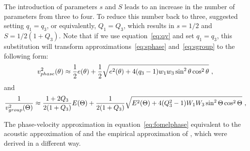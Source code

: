 The introduction of parameters $s$ and $S$ leads to an increase in the number of parameters from three to four.
To reduce this number back to three, \cite{fomel} suggested setting $q_1 = q_3$, 
or equivalently, $Q_1 = Q_3$, which results in $s = 1/2$ and $S = 1/2(1+Q_3)$. Note that if we use equation~\ref{eq:qv} and set $q_1 = q_3$, this substitution will transform approximations~\ref{eq:sphase} and~\ref{eq:sgroup} to the following form:
\begin{equation}
v^2_{phase}(\theta) \approx \frac{1}{2}e(\theta) + \frac{1}{2}\sqrt{e^2(\theta)+4(q_3-1)w_1w_3\sin^2\theta \cos^2\theta}~, \\
\label{eq:fomelphase}
\end{equation}
and
\begin{equation}
\frac{1}{v^2_{group}(\Theta)} \approx \frac{1+2Q_3}{2(1+Q_3)}E(\Theta) + \frac{1}{2(1+Q_3)}\sqrt{E^2(\Theta) + 4(Q^2_3-1)W_1W_3\sin^2\Theta \cos^2\Theta}~,\\
\label{eq:fomelgroup}
\end{equation}

The phase-velocity approximation in equation~\ref{eq:fomelphase}   equivalent to the acoustic approximation 
of \cite{alkavti,alkavti2} and the empirical approximation of \cite{stopin}, which were derived in a different way. 

